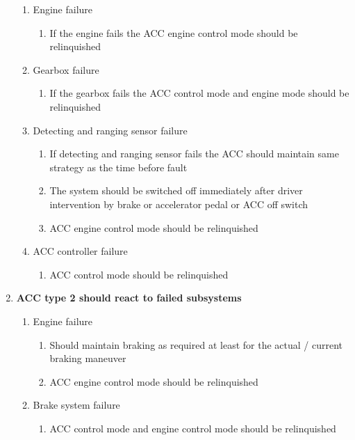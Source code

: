 \begin{enumerate}
\begin{enumerate}[label*=\arabic*]
        \item{Engine failure}
        \begin{enumerate}[label*=\arabic*]
            \item{If the engine fails the ACC engine control mode should be relinquished}    
        \end{enumerate}
        \item{Gearbox failure}
        \begin{enumerate}[label*=\arabic*]
            \item{If the gearbox fails the ACC control mode and engine mode should be relinquished}    
        \end{enumerate}
        \item{Detecting and ranging sensor failure}
        \begin{enumerate}[label*=\arabic*]
            \item{If detecting and ranging sensor fails the ACC should maintain same strategy as the time before fault}
            \item{The system should be switched off immediately after driver intervention by brake or accelerator pedal or ACC off switch}
            \item{ACC engine control mode should be relinquished}
        \end{enumerate}
        \item{ACC controller failure}
        \begin{enumerate}[label*=\arabic*]
            \item{ACC control mode should be relinquished}
        \end{enumerate}
    \end{enumerate}
    \item{\bf ACC type 2 should react to failed subsystems}
    \begin{enumerate}[label*=\arabic*]
       \item{Engine failure}
       \begin{enumerate}[label*=\arabic*]
           \item{Should maintain braking as required at least for the actual / current braking maneuver}
           \item{ACC engine control mode should be relinquished}
       \end{enumerate}
       \item{Brake system failure}
       \begin{enumerate}[label*=\arabic*]
           \item{ACC control mode and engine control mode should be relinquished}

\end{enumerate}
\end{enumerate}
\end{enumerate}

